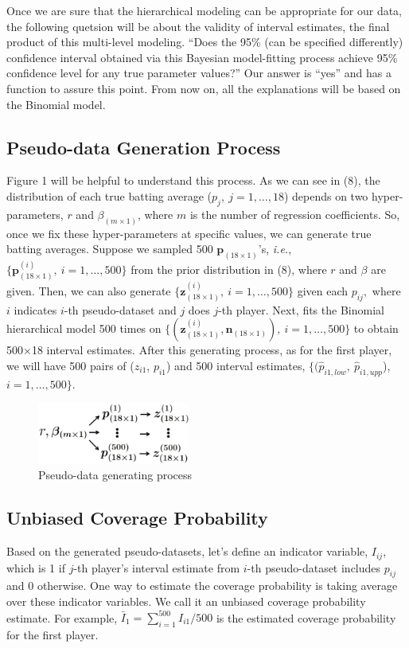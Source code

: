\documentclass[article]{jss}
\begin{document}
Once we are sure that the hierarchical modeling can be appropriate for our data, the following quetsion will be about the validity of interval estimates, the final product of this multi-level modeling. ``Does the 95\% (can be specified differently) confidence interval obtained via this Bayesian model-fitting process achieve 95\% confidence level  for any true parameter values?'' Our answer is ``yes'' and  has a function to assure this point. From now on, all the explanations will be based on the Binomial model.

\subsection{Pseudo-data Generation Process}
Figure 1 will be helpful to understand this process. As we can see in (8), the distribution of each true batting average ($p_{j},~j=1,\ldots, 18$) depends on two hyper-parameters, $r$ and $\beta_{(m\times1)}$, where $m$ is the number of regression coefficients. So, once we fix these hyper-parameters at specific values, we can generate true batting averages. Suppose we sampled 500 $\mathbf{p}_{(18\times1)}$'s, \emph{i.e.}, $\{\mathbf{p}^{(i)}_{(18\times1)},~i=1, \ldots, 500\}$ from the prior distribution in (8), where $r$ and $\beta$ are given. Then, we can also generate $\{\mathbf{z}^{(i)}_{(18\times1)},~i=1, \ldots, 500\}$ given each $p_{ij},$ where $i$ indicates $i$-th pseudo-dataset and $j$ does $j$-th player. Next,  fits the Binomial hierarchical model 500 times on $\{(\mathbf{z}^{(i)}_{(18\times1)}, \mathbf{n}_{(18 \times 1)}),~i=1, \ldots, 500\}$ to obtain 500$\times$18 interval estimates.  After this generating process, as for the first player, we will have 500 pairs of ($z_{i1}$, $p_{i1}$) and 500 interval estimates, $\{(\hat{p}_{i1, low}, ~\hat{p}_{i1, upp}$), $i=1, \ldots, 500\}$.
\begin{figure}[h]
\begin{center}
\includegraphics[width=5cm]{process.png}
\caption{Pseudo-data generating process}
\end{center}
\end{figure}

\subsection{Unbiased Coverage Probability}
Based on the generated pseudo-datasets, let's define an indicator variable, $I_{ij}$, which is 1 if $j$-th player's interval estimate from $i$-th pseudo-dataset includes $p_{ij}$ and 0 otherwise. One way to estimate the coverage probability is taking average over these indicator variables. We call it an unbiased coverage probability estimate. For example, $\bar{I}_{1}=\sum_{i=1}^{500}I_{i1}/500$ is the estimated coverage probability for the first player.
\end{document}
